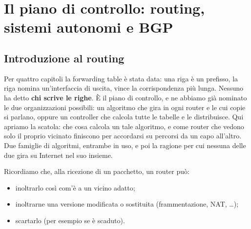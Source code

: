 \chapter{Il piano di controllo: routing, sistemi autonomi e BGP}

\newcommand{\grafoesempio}[1]{%
  \node[rnode] (u) at (0,0) {u};
  \node[rnode] (v) at (1.8,1.4) {v};
  \node[rnode] (w) at (4.2,1.4) {w};
  \node[rnode] (x) at (1.8,-1.4) {x};
  \node[rnode] (y) at (4.2,-1.4) {y};
  \node[rnode] (z) at (6,0) {z};
  \draw[redge] (u) -- node[rcost] {2} (v);
  \draw[redge] (u) -- node[rcost] {1} (x);
  \draw[redge] (u) -- node[rcost, pos=0.35] {5} (w);
  \draw[redge] (v) -- node[rcost] {3} (w);
  \draw[redge] (v) -- node[rcost] {2} (x);
  \draw[redge] (x) -- node[rcost, pos=0.35] {3} (w);
  \draw[redge] (x) -- node[rcost] {1} (y);
  \draw[redge] (w) -- node[rcost] {1} (y);
  \draw[redge] (w) -- node[rcost] {5} (z);
  \draw[redge] (y) -- node[rcost] {2} (z);
  #1
}

\section{Introduzione al routing}

Per quattro capitoli la forwarding table è stata data: una riga è un prefisso, la riga nomina un'interfaccia di uscita, vince
la corrispondenza più lunga. Nessuno ha detto \textbf{chi scrive le righe}. È il piano di controllo, e ne abbiamo già nominato
le due organizzazioni possibili: un algoritmo che gira in ogni router e le cui copie si parlano, oppure un controller che
calcola tutte le tabelle e le distribuisce. Qui apriamo la scatola: che cosa calcola un tale algoritmo, e come router che vedono
solo il proprio vicinato finiscono per accordarsi su percorsi da un capo all'altro. Due famiglie di algoritmi, entrambe in uso,
e poi la ragione per cui nessuna delle due gira su Internet nel suo insieme.

Ricordiamo che, alla ricezione di un pacchetto, un router può:

\begin{itemize}
    \item inoltrarlo così com'è a un vicino adatto;
    \item inoltrarne una versione modificata o sostituita (frammentazione, NAT, \dots);
    \item scartarlo (per esempio se è scaduto).
\end{itemize}

